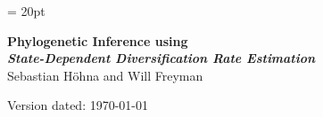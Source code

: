 \documentclass[11pt]{article}
\begin{document}
\renewcommand{\headrulewidth}{0.5pt}
\headsep = 20pt
\lhead{ }

\thispagestyle{plain}
\begin{center}

\textbf{\LARGE Phylogenetic Inference using \RevBayes}\\\vspace{2mm}
\textbf{\it{\Large State-Dependent Diversification Rate Estimation}}\\\vspace{2mm}
\vspace{1cm}
{\Large Sebastian H{\"o}hna and Will Freyman}
\vspace{1cm}
\end{center}

\def \ResourcePath {./}
\def \GlobalResourcePath {../}



Version dated: \today
\end{document}
